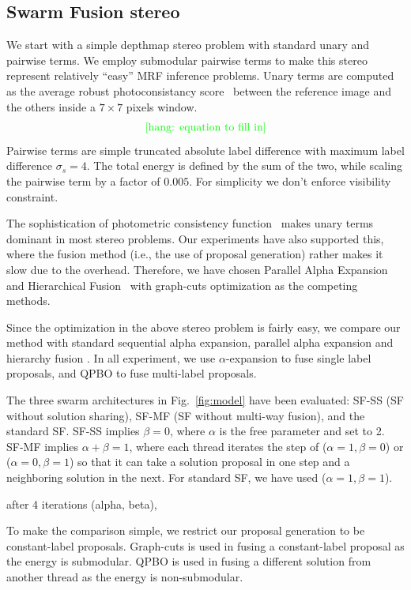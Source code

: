 \subsection{Swarm Fusion stereo}
We start with a simple depthmap stereo problem with standard unary and
pairwise terms. We employ submodular pairwise terms to make this stereo
represent relatively ``easy'' MRF inference problems.
%
Unary terms are computed as the average robust photoconsistancy
score~\cite{woodford} between the reference image and the others inside a $7\times 7$
pixels window.
\begin{equation}
  \text{\textcolor{green}{[hang: {equation to fill in}]}}
\end{equation}
Pairwise terms are simple truncated absolute label
difference with maximum label difference $\sigma_s=4$. The total energy is
defined by the sum of the two, while scaling the pairwise term by a
factor of $0.005$. For simplicity we don't enforce visibility constraint.

%


\noindent The sophistication of photometric consistency
function~\cite{mvs_furukawa_survey} makes unary terms dominant in most
stereo problems.  Our experiments have also supported this, where the
fusion method (i.e., the use of proposal generation) rather makes it
slow due to the overhead. Therefore, we have chosen Parallel Alpha
Expansion~\cite{delong} and Hierarchical Fusion~\cite{delong,olga}
with graph-cuts optimization as the competing methods.

Since the optimization in the above stereo problem is fairly easy, we
compare our method with standard sequential alpha expansion, parallel
alpha expansion \cite{first_fusion_viktor} and hierarchy fusion
\cite{olga}. In all experiment, we use $\alpha$-expansion to fuse
single label proposals, and QPBO to fuse multi-label proposals. 



\noindent The three swarm architectures in Fig.~\ref{fig:model} have
been evaluated: SF-SS (SF without solution sharing), SF-MF (SF without
multi-way fusion), and the standard SF.
%
SF-SS implies $\beta=0$, where $\alpha$ is the free parameter and set to
2. SF-MF implies $\alpha+\beta=1$, where each thread iterates the step
of ($\alpha=1, \beta=0$) or ($\alpha=0, \beta=1$) so that it can take a
solution proposal in one step and a neighboring solution in the
next. For standard SF, we have used ($\alpha=1, \beta=1$).


after 4 iterations (alpha, beta),

%
%
%
%
To make the comparison simple, we restrict our proposal
generation to be constant-label proposals. Graph-cuts is used in fusing
a constant-label proposal as the energy is submodular. QPBO is used in
fusing a different solution from another thread as the energy is
non-submodular.
%
